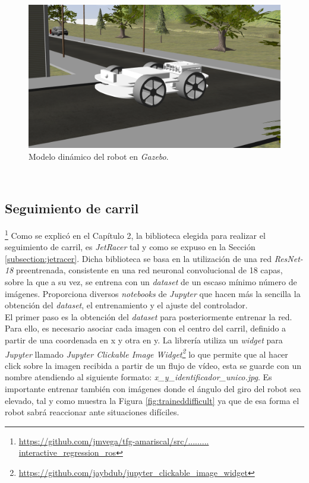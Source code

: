 \begin{figure} [h!]
	\begin{center}
		\includegraphics[width=12cm]{figs/modelGazebo}
	\end{center}
	\caption{Modelo dinámico del robot en \textit{Gazebo}.}
	\label{fig:modelGazebo}
\end{figure}\

\subsection{Seguimiento de carril}
\label{subsection:lanefollower}
\footnote{\url{https://github.com/jmvega/tfg-amariscal/src/......... interactive_regression_ros}}
Como se explicó en el Capítulo 2, la biblioteca elegida para realizar el seguimiento de carril, es \textit{JetRacer} tal y como se expuso en la Sección \ref{subsection:jetracer}.
Dicha biblioteca se basa en la utilización de una red \textit{ResNet-18} preentrenada, consistente en una red neuronal convolucional de 18 capas, sobre la que a su vez, se entrena
con un \textit{dataset} de un escaso mínimo número de imágenes. Proporciona diversos \textit{notebooks} de \textit{Jupyter} que hacen más la sencilla la obtención del
\textit{dataset}, el entrenamiento y el ajuste del controlador.\\

El primer paso es la obtención del \textit{dataset} para posteriormente entrenar la red. Para ello, es necesario asociar cada imagen con el centro del carril, definido a partir de
una coordenada en x y otra en y. La librería utiliza un \textit{widget} para \textit{Jupyter} llamado \textit{Jupyter Clickable Image
	Widget\footnote{\url{https://github.com/jaybdub/jupyter_clickable_image_widget}}} lo que permite que al hacer click sobre la imagen recibida a partir de un flujo de vídeo, esta se
guarde con un nombre atendiendo al siguiente formato: \textit{x\_y\_identificador\_unico.jpg}. Es importante entrenar también con imágenes donde el ángulo del giro del robot sea
elevado, tal y como muestra la Figura \ref{fig:traineddifficult} ya que de esa forma el robot sabrá reaccionar ante situaciones difíciles.\\

